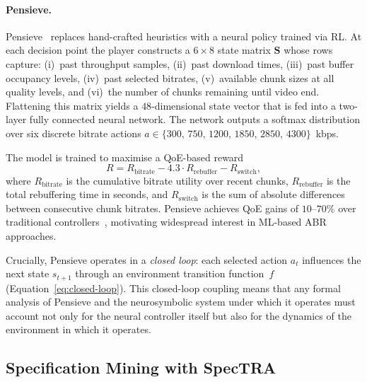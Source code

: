 \documentclass[thesis]{uofithesis} %
\begin{document}
    \paragraph{Pensieve.}
    Pensieve~\cite{pensieve} replaces hand-crafted heuristics with a neural
    policy trained via RL.
    At each decision point the player constructs a $6 \times 8$ state matrix
    $\mathbf{S}$ whose rows capture:
    (i)~past throughput samples,
    (ii)~past download times,
    (iii)~past buffer occupancy levels,
    (iv)~past selected bitrates,
    (v)~available chunk sizes at all quality levels, and
    (vi)~the number of chunks remaining until video end.
    Flattening this matrix yields a $48$-dimensional state vector that is
    fed into a two-layer fully connected neural network.
    The network outputs a softmax distribution over six discrete bitrate
    actions $a \in \{300,\, 750,\, 1200,\, 1850,\, 2850,\, 4300\}$~kbps.
    
    The model is trained to maximise a QoE-based reward
    \begin{equation}
        R = R_{\text{bitrate}}
            - 4.3 \cdot R_{\text{rebuffer}}
            - R_{\text{switch}},
        \label{eq:pensieve-reward}
    \end{equation}
    where $R_{\text{bitrate}}$ is the cumulative bitrate utility over recent
    chunks, $R_{\text{rebuffer}}$ is the total rebuffering time in seconds,
    and $R_{\text{switch}}$ is the sum of absolute differences between
    consecutive chunk bitrates. Pensieve achieves QoE gains of $10$--$70\%$
    over traditional controllers~\cite{pensieve}, motivating widespread
    interest in ML-based ABR approaches.
    
    Crucially, Pensieve operates in a \emph{closed loop}: each selected
    action $a_t$ influences the next state $s_{t+1}$ through an environment
    transition function~$f$ (Equation~\ref{eq:closed-loop}).
    This closed-loop coupling means that any formal analysis of Pensieve
    and the neurosymbolic system under which it operates must account 
    not only for the neural controller itself but also for the
    dynamics of the environment in which it operates.
    
    
    \subsection{Specification Mining with SpecTRA}
    \label{sec:bg-spectra}
    
\end{document}
